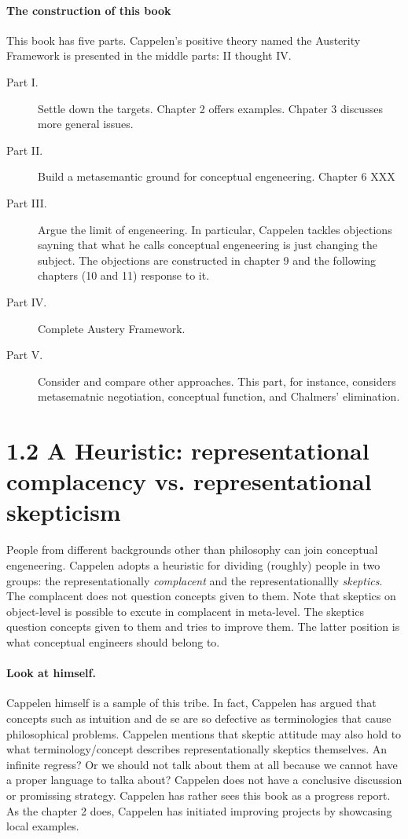 \documentclass[
10pt, %
a4paper, %
twocolumn, %
landscape %
]{article}
\begin{document}
\paragraph{The construction of this book}
This book has five parts. Cappelen's positive theory named the Austerity Framework is presented in the middle parts: II thought IV.

\begin{description}
\item[Part I.] Settle down the targets.
Chapter 2 offers examples. Chpater 3 discusses more general issues.
\item[Part II.] Build a metasemantic ground for conceptual engeneering.
Chapter 6 XXX
\item[Part III.] Argue the limit of engeneering.
In particular, Cappelen tackles objections sayning that what he calls conceptual engeneering is just changing the subject.
The objections are constructed in chapter 9 and the following chapters (10 and 11) response to it.
\item[Part IV.] Complete Austery Framework.
\item[Part V.] Consider and compare other approaches.
This part, for instance, considers metasematnic negotiation, conceptual function, and Chalmers' elimination.
\end{description}


\section*{1.2 A Heuristic: representational complacency vs. representational skepticism}

People from different backgrounds other than philosophy can join conceptual engeneering. Cappelen adopts a heuristic for dividing (roughly) people in two groups: the representationally \emph{complacent} and the representationallly \emph{skeptics}.
The complacent does not question concepts given to them.
Note that skeptics on object-level is possible to excute in complacent in meta-level.
The skeptics question concepts given to them and tries to improve them. The latter position is what conceptual engineers should belong to.

\paragraph{Look at himself.}
Cappelen himself is a sample of this tribe.
In fact, Cappelen has argued that concepts such as intuition and de se are so defective as terminologies that cause philosophical problems.
Cappelen mentions that skeptic attitude may also hold to what terminology/concept describes representationally skeptics themselves. An infinite regress? Or we should not talk about them at all because we cannot have a proper language to talka about? Cappelen does not have a conclusive discussion or promissing strategy. Cappelen has rather sees this book as a progress report. As the chapter 2 does, Cappelen has initiated improving projects by showcasing local examples.
\end{document}
